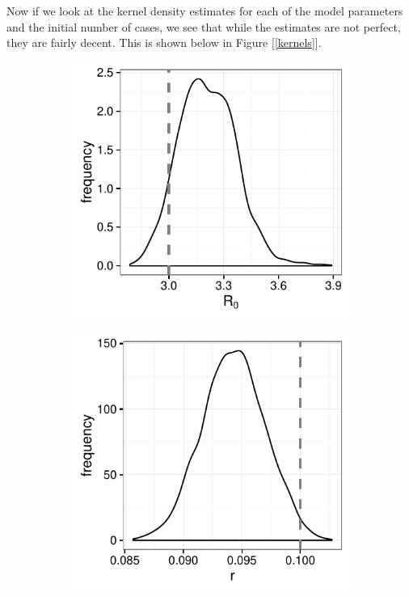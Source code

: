    Now if we look at the kernel density estimates for each of the model parameters and the initial number of cases, we see that while the estimates are not perfect, they are fairly decent. This is shown below in Figure [\ref{kernels}].

    \begin{figure}
    \centering
        \begin{subfigure}[tl]{0.49\textwidth}
            \includegraphics[width=\textwidth]{./images/kernelR0.pdf}
        \end{subfigure}
        \begin{subfigure}[tr]{0.49\textwidth}
            \includegraphics[width=\textwidth]{./images/kernelr.pdf}

\end{subfigure}
\end{figure}
